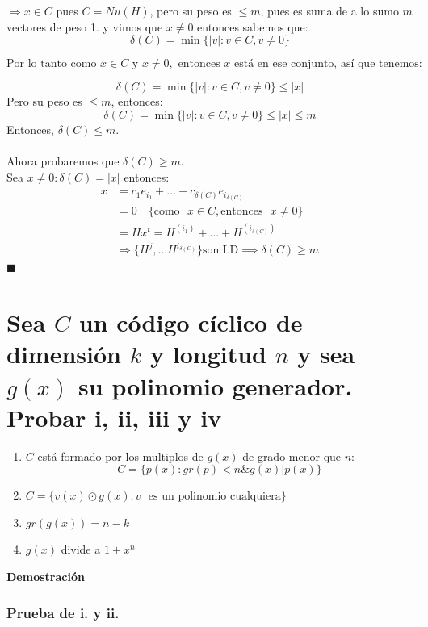\documentclass[11pt, a4paper]{article}
\theoremstyle{definition}
\begin{document}
$\Rightarrow x \in C$ pues $C = Nu(H)$, pero su peso es $\leq m$, pues es suma de a lo sumo $m$ vectores de peso 1.
y vimos que $x \neq 0$ entonces sabemos que:
\[
\delta(C) = \min \{ |v| : v \in C, v \neq 0 \}
\]

\[
\text{Por lo tanto como } x \in C \text{ y } x \neq 0, \text{ entonces } x \text{ está en ese conjunto, así que tenemos:}
\]

\[
\delta(C) = \min \{ |v| : v \in C, v \neq 0 \} \leq |x|
\]
Pero su peso es $\leq m$, entonces:
\[
\delta(C) = \min \{ |v| : v \in C, v \neq 0 \} \leq |x| \leq m
\]
Entonces, $\delta(C) \leq m$.\\ \\
Ahora probaremos que $\delta(C) \geq m$.\\
Sea $x \neq 0 : \delta(C) = |x|$ entonces:
\begin{align*}
    x &= c_1 e_{i_1} + \ldots + c_{\delta(C)} e_{i_{\delta(C)}} \\
      &= 0 \quad \{\text{como} \text{ } x \in C, \text{entonces} \text{ } x \neq 0\} \\
      &= H x^t = H^{(i_1)} + \ldots + H^{(i_{\delta(C)})} \\
      &\Rightarrow \{H^j, \ldots H^{i_{\delta(C)}}\} \text{son LD} \implies \delta(C) \geq m 
\end{align*}
$\blacksquare$

\section{Sea $C$ un código cíclico de dimensión $k$ y longitud $n$ y sea $g(x)$ su polinomio generador. Probar i, ii, iii y iv}
\begin{enumerate}[label=\roman*.]
    \item $C$ está formado por los multiplos de $g(x)$ de grado menor que $n$:
    \[
    C = \{p(x) : gr(p) < n\&g(x)|p(x)\}
    \]
    \item $C = \{v(x) \odot g(x): v \text{ } \text{es un polinomio cualquiera} \}$ 
    \item $gr(g(x)) = n - k$
    \item $g(x)$ divide a $1 + x^n$
\end{enumerate}
\textbf{Demostración}
\subsubsection*{Prueba de i. y ii.}
\end{document}
